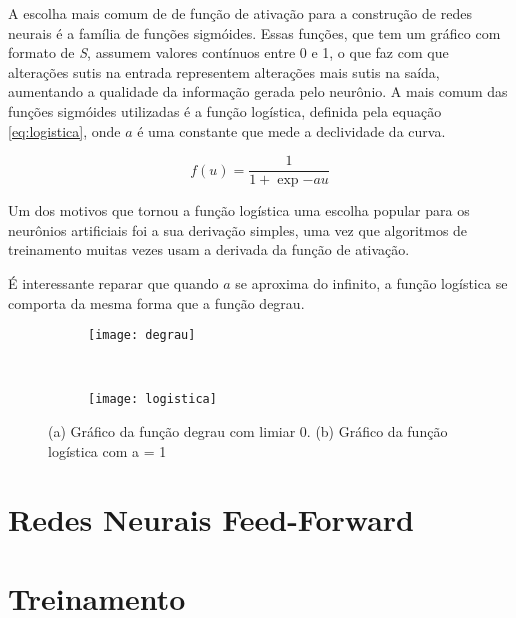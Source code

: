 A escolha mais comum de de função de ativação para a construção de redes neurais é a família de funções sigmóides. Essas funções, que tem um gráfico com formato de \textit{S}, assumem valores contínuos entre 0 e 1, o que faz com que alterações sutis na entrada representem alterações mais sutis na saída, aumentando a qualidade da informação gerada pelo neurônio. A mais comum das funções sigmóides utilizadas é a função logística, definida pela equação \ref{eq:logistica}, onde $a$ é uma constante que mede a declividade da curva.

\begin{equation}

f(u) = \frac{1}{1 + \exp{-au}}

\label{eq:logistica}

\end{equation}

Um dos motivos que tornou a função logística uma escolha popular para os neurônios artificiais foi a sua derivação simples, uma vez que algoritmos de treinamento muitas vezes usam a derivada da função de ativação\cite{Kosabov}.

É interessante reparar que quando $a$ se aproxima do infinito, a função logística se comporta da mesma forma que a função degrau.

\begin{figure}
 \centering
\begin{subfigure}{.5\textwidth}
  \centering
  \texttt{[image: degrau]}
	\caption{}
	\label{fig:ativacao:sub:degrau}
\end{subfigure}\
\begin{subfigure}{.5\textwidth}
  \centering
  \texttt{[image: logistica]}
	\caption{}
	\label{fig:ativacao:sub:logistica}
\end{subfigure}
\caption{(a) Gráfico da função degrau com limiar 0. (b) Gráfico da função logística com a = 1}
\label{fig:ativacao}
\end{figure}




\section{Redes Neurais Feed-Forward}


\section{Treinamento}

